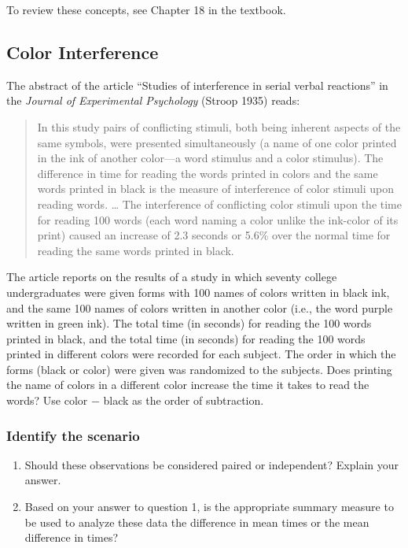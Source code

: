 \documentclass[
]{report}
\begin{document}
To review these concepts, see Chapter 18 in the textbook.

\subsection{Color Interference}\label{color-interference}

The abstract of the article ``Studies of interference in serial verbal reactions'' in the \emph{Journal of Experimental Psychology} (Stroop 1935) reads:

\begin{quote}
In this study pairs of conflicting stimuli, both being inherent aspects of the same symbols, were presented simultaneously (a name of one color printed in the ink of another color---a word stimulus and a color stimulus).
The difference in time for reading the words printed in colors and the same words printed in black is the measure of interference of color stimuli upon reading words. \ldots{}
The interference of conflicting color stimuli upon the time for reading 100 words (each word naming a color unlike the ink-color of its print) caused an increase of 2.3 seconds or 5.6\% over the normal time for reading the same words printed in black.
\end{quote}

The article reports on the results of a study in which seventy college undergraduates were given forms with 100 names of colors written in black ink, and the same 100 names of colors written in another color (i.e., the word purple written in green ink). The total time (in seconds) for reading the 100 words printed in black, and the total time (in seconds) for reading the 100 words printed in different colors were recorded for each subject. The order in which the forms (black or color) were given was randomized to the subjects. Does printing the name of colors in a different color increase the time it takes to read the words? Use color \(-\) black as the order of subtraction.

\subsubsection*{Identify the scenario}\label{identify-the-scenario}

\begin{enumerate}
\def\labelenumi{\arabic{enumi}.}
\item
  Should these observations be considered paired or independent? Explain your answer.
  \vspace{0.5in}
\item
  Based on your answer to question 1, is the appropriate summary measure to be used to analyze these data the difference in mean times or the mean difference in times?
  \vspace{0.25in}
\end{enumerate}
\end{document}
